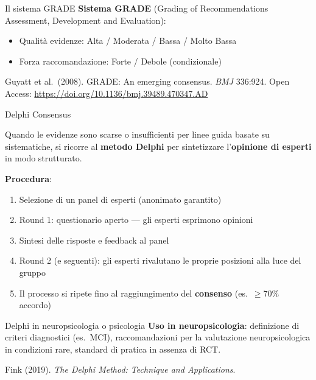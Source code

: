 \documentclass[
  ignorenonframetext,
]{beamer}
\begin{document}
\begin{frame}{Il sistema GRADE}
\label{il-sistema-grade}
\textbf{Sistema GRADE} (Grading of Recommendations Assessment,
Development and Evaluation):

\begin{itemize}\footnotesize
\item Qualità evidenze: Alta / Moderata / Bassa / Molto Bassa
\item Forza raccomandazione: Forte / Debole (condizionale)
\end{itemize}

\vspace{0.2em}

\tiny Guyatt et al.~(2008). GRADE: An emerging consensus. \emph{BMJ}
336:924. Open Access: \url{https://doi.org/10.1136/bmj.39489.470347.AD}
\end{frame}

\begin{frame}{Delphi Consensus}
\label{delphi-consensus}
\small

Quando le evidenze sono scarse o insufficienti per linee guida basate su
sistematiche, si ricorre al \textbf{metodo Delphi} per sintetizzare
l'\textbf{opinione di esperti} in modo strutturato.

\vspace{0.4em}

\textbf{Procedura}:

\begin{enumerate}\footnotesize
\item Selezione di un panel di esperti (anonimato garantito)
\item Round 1: questionario aperto — gli esperti esprimono opinioni
\item Sintesi delle risposte e feedback al panel
\item Round 2 (e seguenti): gli esperti rivalutano le proprie posizioni alla luce del gruppo
\item Il processo si ripete fino al raggiungimento del \textbf{consenso} (es.\ $\geq 70\%$ accordo)
\end{enumerate}

\vspace{0.4em}
\end{frame}

\begin{frame}{Delphi in neuropsicologia o psicologia}
\label{delphi-in-neuropsicologia-o-psicologia}
\textbf{Uso in neuropsicologia}: definizione di criteri diagnostici
(es.~MCI), raccomandazioni per la valutazione neuropsicologica in
condizioni rare, standard di pratica in assenza di RCT.

\vspace{0.2em}

\tiny Fink (2019). \emph{The Delphi Method: Technique and Applications}.
\end{frame}
\end{document}
